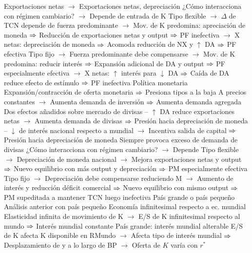 \documentclass{nuevotema}
\begin{document}
\begin{esquemal}
				\4[] Exportaciones netas
				\4[] $\to$ Exportaciones netas, depreciación
				\4[] ¿Cómo interacciona con régimen cambiario?
				\4[] $\to$ Depende de entrada de K
				\4[] Tipo flexible
				\4[] $\to$ $\Delta$ de TCN depende de fuerza predominante
				\4[] $\to$ Mov. de K predomina: apreciación de moneda
				\4[] $\Rightarrow$ Reducción de exportaciones netas y output
				\4[] $\Rightarrow$ PF inefectiva
				\4[] $\to$ X netas: depreciación de moneda
				\4[] $\Rightarrow$ Acomoda reducción de NX y $\uparrow$ DA
				\4[] $\Rightarrow$ PF efectiva
				\4[] Tipo fijo
				\4[] $\to$ Fuerza predominante debe compensarse
				\4[] $\to$ Mov. de K predomina: reducir interés
				\4[] $\Rightarrow$ Expansión adicional de DA y output
				\4[] $\Rightarrow$ PF especialmente efectiva
				\4[] $\to$ X netas: $\uparrow$ interés para $\downarrow$ DA
				\4[] $\Rightarrow$ Caída de DA reduce efecto de estímulo
				\4[] $\Rightarrow$ PF inefectiva
				\4 Política monetaria
				\4[] Expansión/contracción de oferta monetaria
				\4[] $\Rightarrow$ Presiona tipos a la baja
				\4[] A precios constantes
				\4[] $\to$ Aumenta demanda de inversión
				\4[] $\Rightarrow$ Aumenta demanda agregada
				\4[] Dos efectos añadidos sobre mercado de divisas
				\4[] -- $\uparrow$ DA reduce exportaciones netas
				\4[] $\to$ Aumenta demanda de divisas
				\4[] $\Rightarrow$ Presión hacia depreciación de moneda
				\4[] -- $\downarrow$ de interés nacional respecto a mundial
				\4[] $\to$ Incentiva salida de capital
				\4[] $\Rightarrow$ Presión hacia depreciación de moneda
				\4[] Siempre provoca exceso de demanda de divisas
				\4[] ¿Cómo interacciona con régimen cambiario?
				\4[] $\to$ Depende
				\4[] Tipo flexible
				\4[] $\to$ Depreciación de moneda nacional
				\4[] $\to$ Mejora exportaciones netas y output
				\4[] $\Rightarrow$ Nuevo equilibrio con más output y depreciación
				\4[] $\Rightarrow$ PM especialmente efectiva
				\4[] Tipo fijo
				\4[] $\to$ Depreciación debe compensarse reduciendo M
				\4[] $\to$ Aumento de interés y reducción déficit comercial
				\4[] $\Rightarrow$ Nuevo equilibrio con mismo output
				\4[] $\Rightarrow$ PM supeditada a mantener TCN luego inefectiva
			\3 País grande o país pequeño
				\4 Análisis anterior con país pequeño
				\4[] Economía infinitesimal respecto a ec. mundial
				\4[] Elasticidad infinita de movimiento de K
				\4[] $\to$ E/S de K infinitesimal respecto al mundo
				\4[] $\Rightarrow$ Interés mundial constante
				\4 País grande: interés mundial alterable
				\4[] E/S de K afecta K disponible en RMundo
				\4[] $\to$ Afecta tipo de interés mundial
				\4[] $\Rightarrow$ Desplazamiento de y a lo largo de BP
				\4[] $\to$ Oferta de $K$ varía con $r^*$

\end{esquemal}
\end{document}
